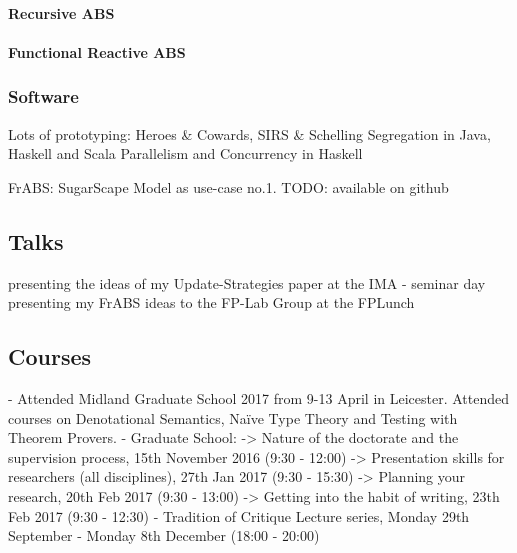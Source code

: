 \paragraph{Recursive ABS}

\paragraph{Functional Reactive ABS}

\subsubsection{Software}
Lots of prototyping:
Heroes \& Cowards, SIRS \& Schelling Segregation in Java, Haskell and Scala
Parallelism and Concurrency in Haskell

FrABS: SugarScape Model as use-case no.1. TODO: available on github

\subsection{Talks}
presenting the ideas of my Update-Strategies paper at the IMA - seminar day
presenting my FrABS ideas to the FP-Lab Group at the FPLunch

\subsection{Courses}
- Attended Midland Graduate School 2017 from 9-13 April in Leicester. Attended courses on Denotational Semantics, Naïve Type Theory and Testing with Theorem Provers.
- Graduate School: 
	-> Nature of the doctorate and the supervision process, 15th November 2016 (9:30 - 12:00)
	-> Presentation skills for researchers (all disciplines), 27th Jan 2017 (9:30 - 15:30)
	-> Planning your research, 20th Feb 2017 (9:30 - 13:00)
	-> Getting into the habit of writing, 23th Feb 2017 (9:30 - 12:30)
- Tradition of Critique Lecture series, Monday 29th September - Monday 8th December (18:00 - 20:00)